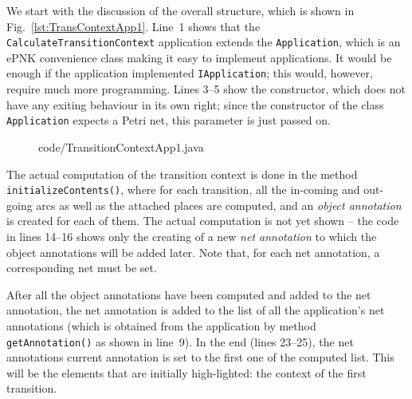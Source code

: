 We start with the discussion of the overall structure, which is shown in
Fig.~\ref{lst:TransContextApp1}. Line~1 shows that the {\tt CalculateTransitionContext}
application extends the {\tt Application}, which is an ePNK convenience class
making it easy to implement applications. It would be enough if the application
implemented {\tt IApplication}; this would, however, require much more programming.
Lines 3--5 show the constructor, which does not have any exiting behaviour in
its own right; since the constructor of the class {\tt Application} expects a
Petri net, this parameter is just passed on.

\begin{figure}[htbp!]
%
  {code/TransitionContextApp1.java}
\end{figure}

%
%
The actual computation of the transition context is done in the method
{\tt initializeContents()}, where for each transition, all the in-coming
and out-going arcs as well as the attached places are computed, and
an \emph{object annotation} is created for each of them. The actual computation
is not yet shown -- the code in lines 14--16 shows only the creating of a 
new \emph{net annotation} to which the object annotations will be added later.
Note that, for each net annotation, a corresponding net must be set. 

After all the object annotations have been computed and added to the net
annotation, the net annotation is added to the list of all the application's net
annotations (which is obtained from the application by method {\tt
getAnnotation()} as shown in line~9). In the end (lines 23--25), the net
annotations current annotation is set to the first one of the computed list.
This will be the elements that are initially high-lighted: the context of the
first transition.
 
